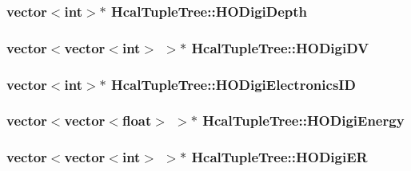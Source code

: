\subsubsection[{H\+O\+Digi\+Depth}]{\setlength{\rightskip}{0pt plus 5cm}vector$<$int$>$$\ast$ Hcal\+Tuple\+Tree\+::\+H\+O\+Digi\+Depth}\label{class_hcal_tuple_tree_a0de64b4e4a03a43dd7bd54afe6b91121}
\hypertarget{class_hcal_tuple_tree_a12d79c1f523b7762cba3fb3e7f9a6290}{}
\subsubsection[{H\+O\+Digi\+D\+V}]{\setlength{\rightskip}{0pt plus 5cm}vector$<$vector$<$int$>$ $>$$\ast$ Hcal\+Tuple\+Tree\+::\+H\+O\+Digi\+D\+V}\label{class_hcal_tuple_tree_a12d79c1f523b7762cba3fb3e7f9a6290}
\hypertarget{class_hcal_tuple_tree_af1e174814a68ab2f6d4d38208388b769}{}
\subsubsection[{H\+O\+Digi\+Electronics\+I\+D}]{\setlength{\rightskip}{0pt plus 5cm}vector$<$int$>$$\ast$ Hcal\+Tuple\+Tree\+::\+H\+O\+Digi\+Electronics\+I\+D}\label{class_hcal_tuple_tree_af1e174814a68ab2f6d4d38208388b769}
\hypertarget{class_hcal_tuple_tree_a379a809505a4af9fbdd8ed073cdadebf}{}
\subsubsection[{H\+O\+Digi\+Energy}]{\setlength{\rightskip}{0pt plus 5cm}vector$<$vector$<$float$>$ $>$$\ast$ Hcal\+Tuple\+Tree\+::\+H\+O\+Digi\+Energy}\label{class_hcal_tuple_tree_a379a809505a4af9fbdd8ed073cdadebf}
\hypertarget{class_hcal_tuple_tree_a541ae5ada795a82a8309b0d3e06a53a3}{}
\subsubsection[{H\+O\+Digi\+E\+R}]{\setlength{\rightskip}{0pt plus 5cm}vector$<$vector$<$int$>$ $>$$\ast$ Hcal\+Tuple\+Tree\+::\+H\+O\+Digi\+E\+R}\label{class_hcal_tuple_tree_a541ae5ada795a82a8309b0d3e06a53a3}
\hypertarget{class_hcal_tuple_tree_af4c462a15fc5e42100dc88e4eaa16f1e}{}
